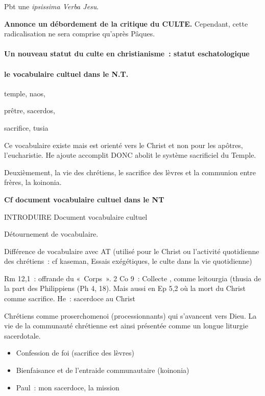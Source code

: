 Pbt une \emph{ipsissima Verba Jesu}.

\textbf{Annonce un débordement de la critique du CULTE.} Cependant,
cette radicalisation ne sera comprise qu'après Pâques.

\hypertarget{un-nouveau-statut-du-culte-en-christianisme-statut-eschatologique}{%
\paragraph{Un nouveau statut du culte en christianisme~: statut
eschatologique}\label{un-nouveau-statut-du-culte-en-christianisme-statut-eschatologique}}

\hypertarget{le-vocabulaire-cultuel-dans-le-n.t.}{%
\paragraph{le vocabulaire cultuel dans le
N.T.}\label{le-vocabulaire-cultuel-dans-le-n.t.}}

temple, naos,

prêtre, sacerdos,

sacrifice, tusia

Ce vocabulaire existe mais est orienté vers le Christ et non pour les
apôtres, l'eucharistie. He ajoute accomplit DONC abolit le système
sacrificiel du Temple.

Deuxièmement, la vie des chrétiens, le sacrifice des lèvres et la
communion entre frères, la koinonia.

\textbf{Cf document vocabulaire cultuel dans le NT}

\hfill\break
INTRODUIRE Document vocabulaire cultuel

Détournement de vocabulaire.

Différence de vocabulaire avec AT (utilisé pour le Christ ou l'activité
quotidienne des chrétiens~: cf kaseman, Essais exégétiques, le culte
dans la vie quotidienne)

Rm 12,1~: offrande du «~Corps~». 2 Co 9~: Collecte , comme leitourgia
(thusia de la part des Philippiens (Ph 4, 18). Mais aussi en Ep 5,2 où
la mort du Christ comme sacrifice. He~: sacerdoce au Christ

Chrétiens comme proserchomenoi (processionnants) qui s'avancent vers
Dieu. La vie de la communauté chrétienne est ainsi présentée comme un
longue liturgie sacerdotale.

\begin{itemize}
\item
   
  Confession de foi (sacrifice des lèvres)
   
\item
   
  Bienfaisance et de l'entraide communautaire (koinonia)
   
\item
   
  Paul~: mon sacerdoce, la mission
   
\end{itemize}


